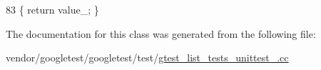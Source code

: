 \begin{DoxyCode}
83 \{ \textcolor{keywordflow}{return} value\_; \}
\end{DoxyCode}


The documentation for this class was generated from the following file\+:\begin{DoxyCompactItemize}
\item 
vendor/googletest/googletest/test/\hyperlink{gtest__list__tests__unittest___8cc}{gtest\+\_\+list\+\_\+tests\+\_\+unittest\+\_\+.\+cc}\end{DoxyCompactItemize}
